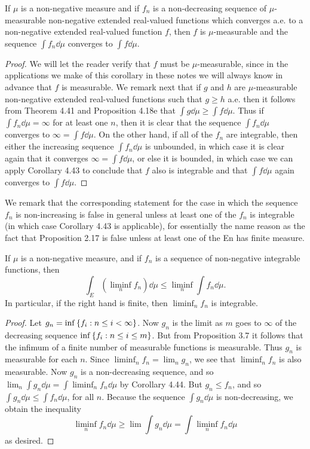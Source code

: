 \begin{corollary}
If $\mu$ is a non-negative measure and if $f_n$ is a non-decreasing sequence of $\mu$-measurable non-negative extended real-valued functions which converges a.e. to a non-negative extended real-valued function $f$, then $f$ is $\mu$-measurable and the sequence $\int f_n\dd\mu$ converges to $\int f\dd\mu$.
\end{corollary}

\begin{proof}
We will let the reader verify that $f$ must be $\mu$-measurable, since in the applications we make of this corollary in these notes we will always know in advance that $f$ is measurable. We remark next that if $g$ and $h$ are $\mu$-measurable non-negative extended real-valued functions such that $g\geq h$ a.e. then it follows from Theorem 4.41 and Proposition 4.18e that $\int g\dd\mu\geq\int f\dd\mu$. Thus if $\int f_n\dd\mu=\infty$ for at least one $n$, then it is clear that the sequence $\int f_n\dd\mu$ converges to $\infty=\int f\dd\mu$. On the other hand, if all of the $f_n$ are integrable, then either the increasing sequence $\int f_n\dd\mu$ is unbounded, in which case it is clear again that it converges $\infty=\int f\dd\mu$, or else it is bounded, in which case we can apply Corollary 4.43 to conclude that $f$ also is integrable and that $\int f\dd\mu$ again converges to $\int f\dd\mu$.
\end{proof}

We remark that the corresponding statement for the case in which the sequence $f_n$ is non-increasing is false in general unless at least one of the $f_n$ is integrable (in which case Corollary 4.43 is applicable), for essentially the name reason as the fact that Proposition 2.17 is false unless at least one of the En has finite measure.

\begin{theorem}
If $\mu$ is a non-negative measure, and if $f_n$ is a sequence of non-negative integrable functions, then $$\int_E(\liminf_nf_n)\dd\mu\leq\liminf_n\int f_n\dd\mu.$$ In particular, if the right hand is finite, then $\liminf_nf_n$ is integrable.

\end{theorem}

\begin{proof}
Let $g_n=\inf\left\{f_i:n\leq i<\infty\right\}$. Now $g_n$ is the limit as $m$ goes to $\infty$ of the decreasing sequence $\inf\left\{f_i:n\leq i\leq m\right\}$. But from Proposition 3.7 it follows that the infimum of a finite number of measurable functions is measurable. Thus $g_n$ is measurable for each $n$. Since $\liminf_nf_n=\lim_ng_n$, we see that $\liminf_nf_n$ is also measurable. Now $g_n$ is a non-decreasing sequence, and so $\lim_n\int g_n\dd\mu=\int\liminf_nf_n\dd\mu$ by Corollary 4.44. But $g_n\leq f_n$, and so $\int g_n\dd\mu\leq\int f_n\dd\mu$, for all $n$. Because the sequence $\int g_n\dd\mu$ is non-decreasing, we obtain the inequality $$\liminf_nf_n\dd\mu\geq\lim\int g_n\dd\mu=\int\liminf_nf_n\dd\mu$$ as desired.
\end{proof}


